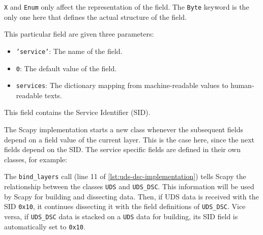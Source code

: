 \texttt{X} and \texttt{Enum} only affect the representation of the field. The \texttt{Byte} keyword is the only one here that defines the actual structure of the field.

This particular field are given three parameters:

\begin{itemize}
    \item \texttt{'service'}: The name of the field.
    \item \texttt{0}: The default value of the field.
    \item \texttt{services}: The dictionary mapping from machine-readable values to human-readable texts.
\end{itemize}

This field contains the Service Identifier (SID).

The Scapy implementation starts a new class whenever the subsequent fields depend on a field value of the current layer. This is the case here, since the next fields depend on the SID. The service specific fields are defined in their own classes, for example:


The \texttt{bind_layers} call (line 11 of \autoref{lst:uds-dsc-implementation}) tells Scapy the relationship between the classes \texttt{UDS} and \texttt{UDS_DSC}. This information will be used by Scapy for building and dissecting data.
Then, if UDS data is received with the SID \texttt{0x10}, it continues dissecting it with the field definitions of \texttt{UDS_DSC}. Vice versa, if \texttt{UDS_DSC} data is stacked on a \texttt{UDS} data for building, its SID field is automatically set to \texttt{0x10}.

